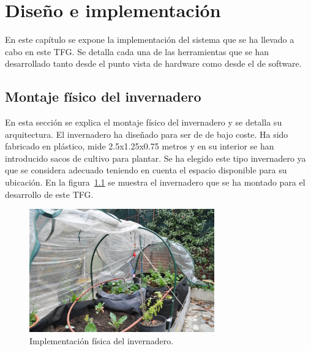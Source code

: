 \documentclass[a4paper, 12pt, oneside]{book}
\begin{document}

\cleardoublepage
\chapter{Diseño e implementación}
\label{chap:diseño e implementación}
En este capítulo se expone la implementación del sistema que se ha llevado a cabo en este TFG. Se detalla cada una de las herramientas que se han desarrollado tanto desde el punto vista de hardware como desde el de software.

\section{Montaje físico del invernadero}
\label{sec: montaje físico del invernadero}
En esta sección se explica el montaje físico del invernadero y se detalla su arquitectura.
El invernadero ha diseñado para ser de de bajo coste. Ha sido fabricado en plástico, mide 2.5x1.25x0.75 metros y en su interior se han introducido sacos de cultivo para plantar. Se ha elegido este tipo invernadero ya que se considera adecuado teniendo en cuenta el espacio disponible para su ubicación. En la figura~\ref{figura:invernadero} se muestra el invernadero que se ha montado para el desarrollo de este TFG.
\begin{figure}[H]
	\centering
    \includegraphics[width=8cm, keepaspectratio]{img/invernadero}
    \caption{Implementación física del invernadero.}
    \label{figura:invernadero}
\end{figure}
\end{document}
